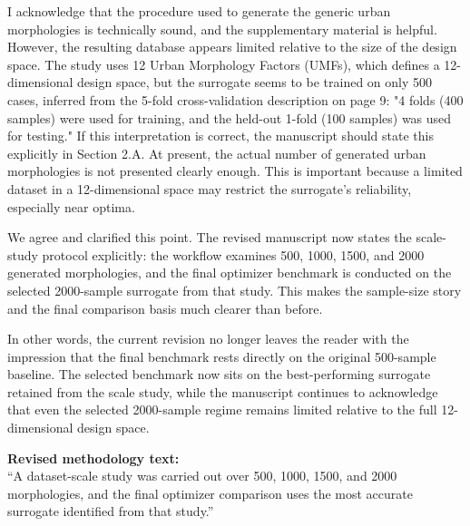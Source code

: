 \begin{ReviewerComment}
I acknowledge that the procedure used to generate the generic urban morphologies is technically sound, and the supplementary material is helpful. However, the resulting database appears limited relative to the size of the design space. The study uses 12 Urban Morphology Factors (UMFs), which defines a 12-dimensional design space, but the surrogate seems to be trained on only 500 cases, inferred from the 5-fold cross-validation description on page 9: "4 folds (400 samples) were used for training, and the held-out 1-fold (100 samples) was used for testing." If this interpretation is correct, the manuscript should state this explicitly in Section 2.A. At present, the actual number of generated urban morphologies is not presented clearly enough. This is important because a limited dataset in a 12-dimensional space may restrict the surrogate's reliability, especially near optima.
\end{ReviewerComment}
%
\begin{Answer}
We agree and clarified this point. The revised manuscript now states the scale-study protocol explicitly: the workflow examines 500, 1000, 1500, and 2000 generated morphologies, and the final optimizer benchmark is conducted on the selected 2000-sample surrogate from that study. This makes the sample-size story and the final comparison basis much clearer than before.

In other words, the current revision no longer leaves the reader with the impression that the final benchmark rests directly on the original 500-sample baseline. The selected benchmark now sits on the best-performing surrogate retained from the scale study, while the manuscript continues to acknowledge that even the selected 2000-sample regime remains limited relative to the full 12-dimensional design space.
\end{Answer}
\begin{RevisionExcerpt}
\noindent\textbf{Revised methodology text:}\\
``A dataset-scale study was carried out over 500, 1000, 1500, and 2000 morphologies, and the final optimizer comparison uses the most accurate surrogate identified from that study.''
\end{RevisionExcerpt}

